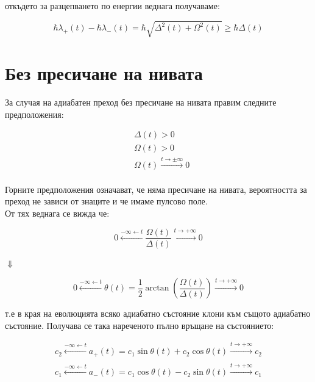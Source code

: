     откъдето за разцепването по енергии веднага получаваме:

    \begin{equation}
        \hbar\lambda_+(t) - \hbar\lambda_-(t) = \hbar \sqrt{\Delta^2(t)+\Omega^2(t)} \ge \hbar\Delta(t)
    \end{equation}
    
    \nocite{vitanov2001laser}

    \section{Без пресичане на нивата}

    За случая на адиабатен преход без пресичане на нивата правим следните предположения:

    \begin{align}
        & \Delta (t) > 0 \\
        & \Omega (t) > 0 \\
        & \Omega (t) \xrightarrow[]{t\rightarrow \pm \infty} 0
    \end{align}

    Горните предположения означават, че няма пресичане на нивата, вероятността за преход не зависи от знаците и че имаме пулсово поле. \\
    От тях веднага се вижда че:

    \begin{equation}
        0 \xleftarrow[]{-\infty\leftarrow t}\frac{\Omega(t)}{\Delta(t)}\xrightarrow[]{t\rightarrow + \infty} 0
    \end{equation}

    \begin{center}
        $\Downarrow$
    \end{center}

    \begin{equation}
        0 \xleftarrow[]{-\infty\leftarrow t}\theta (t) = \frac{1}{2}\arctan \left(\frac{\Omega(t)}{\Delta(t)}\right)\xrightarrow[]{t\rightarrow + \infty} 0
    \end{equation}

    т.е в края на еволюцията всяко адиабатно състояние клони към същото адиабатно състояние. Получава се така нареченото пълно връщане на състоянието:

    \begin{align}
        c_2\xleftarrow[]{-\infty\leftarrow t}a_+(t) = c_1 \sin\theta (t) + c_2 \cos\theta (t) \xrightarrow[]{t\rightarrow + \infty} c_2\\
        c_1 \xleftarrow[]{-\infty\leftarrow t} a_-(t) = c_1 \cos\theta (t) - c_2 \sin\theta (t)\xrightarrow[]{t\rightarrow + \infty} c_1
    \end{align}


